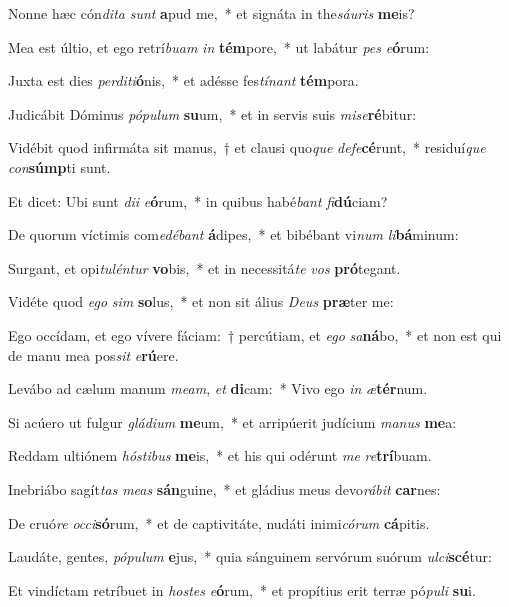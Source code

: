 \item Nonne hæc cón\textit{di}\textit{ta} \textit{sunt} \textbf{a}pud me,~* et signáta in the\textit{sáu}\textit{ris} \textbf{me}is?
\item Mea est últio, et ego retrí\textit{bu}\textit{am} \textit{in} \textbf{tém}pore,~* ut labátur \textit{pes} \textit{e}\textbf{ó}rum:
\item Juxta est dies \textit{per}\textit{di}\textit{ti}\textbf{ó}nis,~* et adésse fes\textit{tí}\textit{nant} \textbf{tém}pora.
\item Judicábit Dóminus \textit{pó}\textit{pu}\textit{lum} \textbf{su}um,~* et in servis suis \textit{mi}\textit{se}\textbf{ré}bitur:
\item Vidébit quod infirmáta sit manus,~† et clausi quo\textit{que} \textit{de}\textit{fe}\textbf{cé}runt,~* residuí\textit{que} \textit{con}\textbf{súmp}ti sunt.
\item Et dicet: Ubi sunt \textit{di}\textit{i} \textit{e}\textbf{ó}rum,~* in quibus habé\textit{bant} \textit{fi}\textbf{dú}ciam?
\item De quorum víctimis com\textit{e}\textit{dé}\textit{bant} \textbf{á}dipes,~* et bibébant vi\textit{num} \textit{li}\textbf{bá}minum:
\item Surgant, et opi\textit{tu}\textit{lén}\textit{tur} \textbf{vo}bis,~* et in necessitá\textit{te} \textit{vos} \textbf{pró}tegant.
\item Vidéte quod \textit{e}\textit{go} \textit{sim} \textbf{so}lus,~* et non sit álius \textit{De}\textit{us} \textbf{præ}ter me:
\item Ego occídam, et ego vívere fáciam:~† percútiam, et \textit{e}\textit{go} \textit{sa}\textbf{ná}bo,~* et non est qui de manu mea pos\textit{sit} \textit{e}\textbf{rú}ere.
\item Levábo ad cælum manum \textit{me}\textit{am}, \textit{et} \textbf{di}cam:~* Vivo ego \textit{in} \textit{æ}\textbf{tér}num.
\item Si acúero ut fulgur \textit{glá}\textit{di}\textit{um} \textbf{me}um,~* et arripúerit judícium \textit{ma}\textit{nus} \textbf{me}a:
\item Reddam ultiónem \textit{hós}\textit{ti}\textit{bus} \textbf{me}is,~* et his qui odérunt \textit{me} \textit{re}\textbf{trí}buam.
\item Inebriábo sagít\textit{tas} \textit{me}\textit{as} \textbf{sán}guine,~* et gládius meus devo\textit{rá}\textit{bit} \textbf{car}nes:
\item De cruó\textit{re} \textit{oc}\textit{ci}\textbf{só}rum,~* et de captivitáte, nudáti inimi\textit{có}\textit{rum} \textbf{cá}pitis.
\item Laudáte, gentes, \textit{pó}\textit{pu}\textit{lum} \textbf{e}jus,~* quia sánguinem servórum suórum \textit{ul}\textit{ci}\textbf{scé}tur:
\item Et vindíctam retríbuet in \textit{hos}\textit{tes} \textit{e}\textbf{ó}rum,~* et propítius erit terræ pó\textit{pu}\textit{li} \textbf{su}i.
